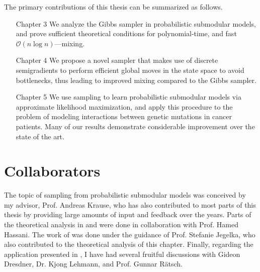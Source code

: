 The primary contributions of this thesis can be summarized as follows.
\begin{itemize}[leftmargin=3.5em]
\item[\textsf{Chapter 3}] We analyze the Gibbs sampler in probabilistic submodular models, and prove sufficient theoretical conditions for polynomial-time, and fast$\mathcal{O}(n\log n)$---mixing.
\item[\textsf{Chapter 4}] We propose a novel sampler that makes use of discrete semigradients to perform efficient global moves in the state space to avoid bottlenecks, thus leading to improved mixing compared to the Gibbs sampler.
\item[\textsf{Chapter 5}] We use sampling to learn probabilistic submodular models via approximate likelihood maximization, and apply this procedure to the problem of modeling interactions between genetic mutations in cancer patients.
Many of our results demonstrate considerable improvement over the state of the art.
\end{itemize}

\section{Collaborators}
The topic of sampling from probabilistic submodular models was conceived by my advisor, Prof. Andreas Krause, who has also contributed to most parts of this thesis by providing large amounts of input and feedback over the years.
Parts of the theoretical analysis in  and  were done in collaboration with Prof. Hamed Hassani.
The work of  was done under the guidance of Prof. Stefanie Jegelka, who also contributed to the theoretical analysis of this chapter.
Finally, regarding the application presented in , I have had several fruitful discussions with Gideon Dresdner, Dr. Kjong Lehmann, and Prof. Gunnar Rätsch.